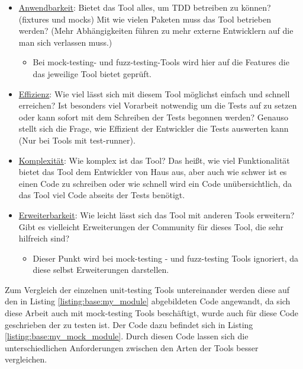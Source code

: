\begin{itemize}
    \item \underline{Anwendbarkeit}:\newline
    Bietet das Tool alles, um TDD betreiben zu können? (\Glspl{fixture} und \Glspl{mock})
    Mit wie vielen Paketen muss das Tool betrieben werden? (Mehr Abhängigkeiten führen zu
    mehr externe Entwicklern auf die man sich verlassen muss.)
    \begin{itemize}
        \item Bei \gls{mock}-testing- und \gls{fuzz}-testing-Tools wird hier auf die
        Features die das jeweilige Tool bietet geprüft.
    \end{itemize}
    
    \item \underline{Effizienz}:\newline
    Wie viel lässt sich mit diesem Tool möglichst einfach und
    schnell erreichen? Ist besonders viel Vorarbeit notwendig um die Tests
    auf zu setzen oder kann sofort mit dem Schreiben der Tests begonnen
    werden?
    \newline
    Genauso stellt sich die Frage, wie Effizient der Entwickler die Tests
    auswerten kann (Nur bei Tools mit test-runner).
    
    \item \underline{Komplexität}:\newline
    Wie komplex ist das Tool? Das heißt, wie viel Funktionalität
    bietet das Tool dem Entwickler von Haus aus, aber auch wie schwer
    ist es einen Code zu schreiben oder wie schnell wird ein Code unübersichtlich, da
    das Tool viel Code abseits der Tests benötigt.
    
    \item \underline{Erweiterbarkeit}:\newline
    Wie leicht lässt sich das Tool mit anderen Tools erweitern?
    Gibt es vielleicht Erweiterungen der Community für dieses Tool, die sehr
    hilfreich sind?
    \begin{itemize}
        \item Dieser Punkt wird bei \gls{mock}-testing - und \gls{fuzz}-testing Tools ignoriert,
        da diese selbst Erweiterungen darstellen.
    \end{itemize}
\end{itemize}
\noindent
Zum Vergleich der einzelnen unit-testing Tools untereinander werden diese auf den in Listing
\ref{listing:base:my_module} abgebildeten Code angewandt, da sich diese Arbeit auch mit
\gls{mock}-testing Tools beschäftigt, wurde auch für diese Code geschrieben der zu testen ist.
Der Code dazu befindet sich in Listing \ref{listing:base:my_mock_module}. Durch diesen Code
lassen sich die unterschiedlichen Anforderungen zwischen den Arten der Tools besser vergleichen.


